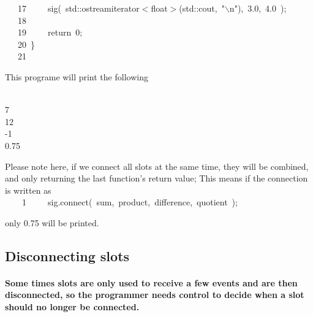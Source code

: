 \documentclass[9pt,onside,a4paper]{article}
\newcommand{\hlstd}[1]{\textcolor[rgb]{0.2,0,0.4}{#1}}
\newcommand{\hlnum}[1]{\textcolor[rgb]{0.2,0.73,0.02}{#1}}
\newcommand{\hlesc}[1]{\textcolor[rgb]{0.65,0.09,0.38}{#1}}
\newcommand{\hlstr}[1]{\textcolor[rgb]{0.09,0.38,0.65}{#1}}
\newcommand{\hlopt}[1]{\textcolor[rgb]{0.33,0.33,0.33}{#1}}
\newcommand{\hllin}[1]{\textcolor[rgb]{0.6,0.6,0.6}{#1}}
\newcommand{\hlkwa}[1]{\textcolor[rgb]{1,0.19,0.19}{#1}}
\newcommand{\hlkwb}[1]{\textcolor[rgb]{0.96,0.55,0.14}{#1}}
\newcommand{\hlkwd}[1]{\textcolor[rgb]{0.82,0.11,0.93}{#1}}
\begin{document}
\hllin{\ \ \ 17\ }\hlstd{}\hlstd{\ \ \ \ }\hlstd{}\hlkwd{sig}\hlstd{}\hlopt{(\ }\hlstd{std}\hlopt{::}\hlstd{ostream\textunderscore iterator}\hlopt{$<$}\hlstd{}\hlkwb{float}\hlstd{}\hlopt{$>$(}\hlstd{std}\hlopt{::}\hlstd{cout}\hlopt{,\ }\hlstd{}\hlstr{"}\hlesc{$\backslash$n}\hlstr{"}\hlstd{}\hlopt{),\ }\hlstd{}\hlnum{3.0}\hlstd{}\hlopt{,\ }\hlstd{}\hlnum{4.0\ }\hlstd{}\hlopt{);\ }\\
\hllin{\ \ \ 18\ }\hlstd{\\
\hllin{\ \ \ 19\ }}\hlstd{\ \ \ \ }\hlstd{}\hlkwa{return\ }\hlstd{}\hlnum{0}\hlstd{}\hlopt{;}\\
\hllin{\ \ \ 20\ }\hlstd{}\hlopt{\}}\\
\hllin{\ \ \ 21\ }\hlstd{}\\
\mbox{}
\normalfont
\normalsize

This programe will print the following  
\begin{shaded}
{\small
\ttfamily
~\\
7 \\
12 \\
-1 \\
0.75 
\normalfont
}
\end{shaded}

Please note here, if we connect all slots at the same time, they will be combined, and only returning the last function's return value; This means if the connection is written as \\

\noindent
\ttfamily
\hlstd{\hllin{\ \ \ \ 1\ }}\hlstd{\ \ \ \ }\hlstd{sig}\hlopt{.}\hlstd{}\hlkwd{connect}\hlstd{}\hlopt{(\ }\hlstd{sum}\hlopt{,\ }\hlstd{product}\hlopt{,\ }\hlstd{difference}\hlopt{,\ }\hlstd{quotient\ }\hlopt{);}\\
\mbox{}
\normalfont
\normalsize

only \hlstd{0.75} will be printed.


\subsection{Disconnecting slots}

\paragraph{Some times slots are only used to receive a few events and are then disconnected, so the programmer needs control to decide when a slot should no longer be connected.\\}
\end{document}
